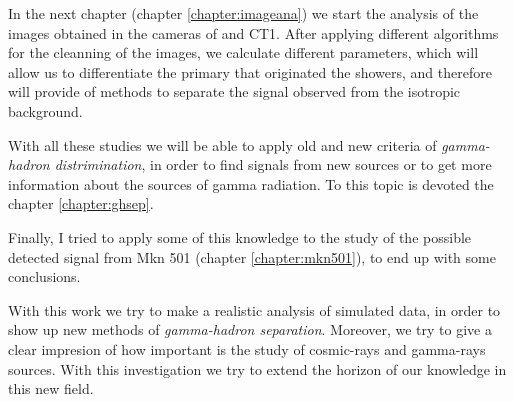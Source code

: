 In the next chapter (chapter \ref{chapter:imageana}) we start the
analysis of the images obtained in the cameras of \MAGIC and CT1.
After applying different algorithms for the cleanning of the images,
we calculate different parameters, which will allow us to
differentiate the primary that originated the showers, and therefore
will provide of methods to separate the signal observed from the
isotropic background.

With all these studies we will be able to apply old and new criteria
of \emph{gamma-hadron distrimination}, in order to find signals from
new sources or to get more information about the sources of gamma
radiation. To this topic is devoted the chapter \ref{chapter:ghsep}.

Finally, I tried to apply some of this knowledge to the study of the
possible detected signal from Mkn 501 (chapter \ref{chapter:mkn501}),
to end up with some conclusions.

With this work we try to make a realistic analysis of simulated data,
in order to show up new methods of \emph{gamma-hadron separation}.
Moreover, we try to give a clear impresion of how important is the
study of cosmic-rays and gamma-rays sources. With this investigation
we try to extend the horizon of our knowledge in this new field.

\endinput
%

